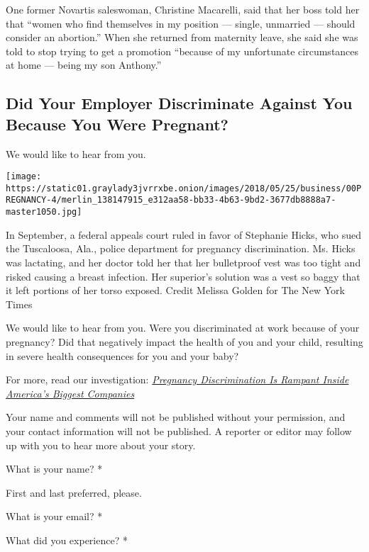 One former Novartis saleswoman, Christine Macarelli, said that her boss
told her that ``women who find themselves in my position --- single,
unmarried --- should consider an abortion.'' When she returned from
maternity leave, she said she was told to stop trying to get a promotion
``because of my unfortunate circumstances at home --- being my son
Anthony.''

\hypertarget{did-your-employer-discriminate-against-you-because-you-were-pregnant}{%
\subsection{Did Your Employer Discriminate Against You Because You Were
Pregnant?}\label{did-your-employer-discriminate-against-you-because-you-were-pregnant}}

We would like to hear from you.

\texttt{[image: https://static01.graylady3jvrrxbe.onion/images/2018/05/25/business/00PREGNANCY-4/merlin\_138147915\_e312aa58-bb33-4b63-9bd2-3677db8888a7-master1050.jpg]}

In September, a federal appeals court ruled in favor of Stephanie Hicks,
who sued the Tuscaloosa, Ala., police department for pregnancy
discrimination. Ms. Hicks was lactating, and her doctor told her that
her bulletproof vest was too tight and risked causing a breast
infection. Her superior's solution was a vest so baggy that it left
portions of her torso exposed. Credit Melissa Golden for The New York
Times

We would like to hear from you. Were you discriminated at work because
of your pregnancy? Did that negatively impact the health of you and your
child, resulting in severe health consequences for you and your baby?

For more, read our investigation:
\emph{\href{https://www.nytimes3xbfgragh.onion/interactive/2018/06/15/business/pregnancy-discrimination.html}{Pregnancy
Discrimination Is Rampant Inside America's Biggest Companies}}

Your name and comments will not be published without your permission,
and your contact information will not be published. A reporter or editor
may follow up with you to hear more about your story.

What is your name? *

First and last preferred, please.

What is your email? *

What did you experience? *

